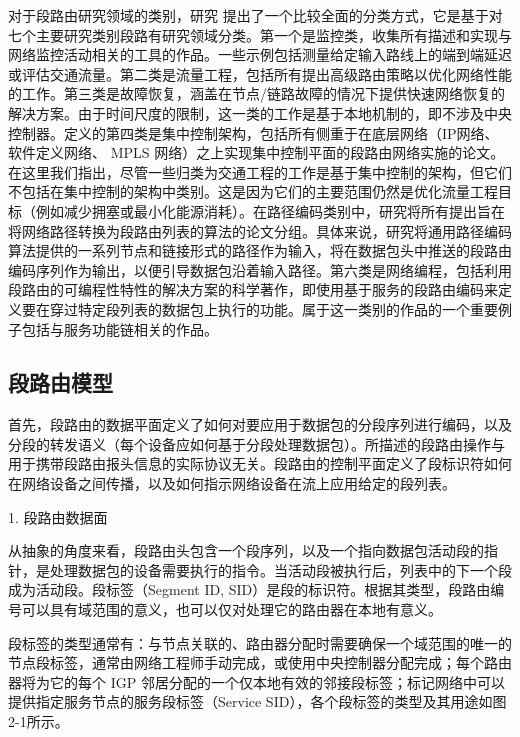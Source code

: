 对于段路由研究领域的类别，研究 \cite{SRSURVEYS} 提出了一个比较全面的分类方式，它是基于对七个主要研究类别段路有研究领域分类。第一个是监控类，收集所有描述和实现与网络监控活动相关的工具的作品。一些示例包括测量给定输入路线上的端到端延迟或评估交通流量。第二类是流量工程，包括所有提出高级路由策略以优化网络性能的工作。第三类是故障恢复，涵盖在节点/链路故障的情况下提供快速网络恢复的解决方案。由于时间尺度的限制，这一类的工作是基于本地机制的，即不涉及中央控制器。定义的第四类是集中控制架构，包括所有侧重于在底层网络（IP网络、软件定义网络、 \gls*{MPLS} 网络）之上实现集中控制平面的段路由网络实施的论文。在这里我们指出，尽管一些归类为交通工程的工作是基于集中控制的架构，但它们不包括在集中控制的架构中类别。这是因为它们的主要范围仍然是优化流量工程目标（例如减少拥塞或最小化能源消耗）。在路径编码类别中，研究将所有提出旨在将网络路径转换为段路由列表的算法的论文分组。具体来说，研究将通用路径编码算法提供的一系列节点和链接形式的路径作为输入，将在数据包头中推送的段路由编码序列作为输出，以便引导数据包沿着输入路径。第六类是网络编程，包括利用段路由的可编程性特性的解决方案的科学著作，即使用基于服务的段路由编码来定义要在穿过特定段列表的数据包上执行的功能。属于这一类别的作品的一个重要例子包括与服务功能链相关的作品。

\subsection{段路由模型}

首先，段路由的数据平面定义了如何对要应用于数据包的分段序列进行编码，以及分段的转发语义（每个设备应如何基于分段处理数据包）。所描述的段路由操作与用于携带段路由报头信息的实际协议无关。段路由的控制平面定义了段标识符如何在网络设备之间传播，以及如何指示网络设备在流上应用给定的段列表。

1. 段路由数据面

从抽象的角度来看，段路由头包含一个段序列，以及一个指向数据包活动段的指针，是处理数据包的设备需要执行的指令。当活动段被执行后，列表中的下一个段成为活动段。段标签（Segment ID, SID）是段的标识符。根据其类型，段路由编号可以具有域范围的意义，也可以仅对处理它的路由器在本地有意义。

段标签的类型通常有：与节点关联的、路由器分配时需要确保一个域范围的唯一的节点段标签，通常由网络工程师手动完成，或使用中央控制器分配完成；每个路由器将为它的每个 \gls*{IGP} 邻居分配的一个仅本地有效的邻接段标签；标记网络中可以提供指定服务节点的服务段标签（Service SID），各个段标签的类型及其用途如图2-1所示。

